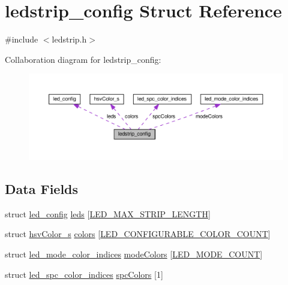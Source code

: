 \hypertarget{structledstrip__config}{\section{ledstrip\+\_\+config Struct Reference}
\label{structledstrip__config}
}


{\ttfamily \#include $<$ledstrip.\+h$>$}



Collaboration diagram for ledstrip\+\_\+config\+:\nopagebreak
\begin{figure}[H]
\begin{center}
\leavevmode
\includegraphics[width=350pt]{structledstrip__config__coll__graph}
\end{center}
\end{figure}
\subsection*{Data Fields}
\begin{DoxyCompactItemize}
\item 
struct \hyperlink{structled__config}{led\+\_\+config} \hyperlink{structledstrip__config_adbcd2e3a0ba8f4b014f75e967ed5f180}{leds} \mbox{[}\hyperlink{config_2ledstrip_8h_a7f8ff468ff6bbb673274f84e042cad47}{L\+E\+D\+\_\+\+M\+A\+X\+\_\+\+S\+T\+R\+I\+P\+\_\+\+L\+E\+N\+G\+T\+H}\mbox{]}
\item 
struct \hyperlink{structhsvColor__s}{hsv\+Color\+\_\+s} \hyperlink{structledstrip__config_a1a7c33abb0d7b2ee9cf1e074cf499169}{colors} \mbox{[}\hyperlink{config_2ledstrip_8h_a558c50db19fe692e9ab8afcfc30443fc}{L\+E\+D\+\_\+\+C\+O\+N\+F\+I\+G\+U\+R\+A\+B\+L\+E\+\_\+\+C\+O\+L\+O\+R\+\_\+\+C\+O\+U\+N\+T}\mbox{]}
\item 
struct \hyperlink{structled__mode__color__indices}{led\+\_\+mode\+\_\+color\+\_\+indices} \hyperlink{structledstrip__config_a443dbc325ddf7a7a0bb12342c75f50d5}{mode\+Colors} \mbox{[}\hyperlink{config_2ledstrip_8h_aae88569d0f355e430fcee9db484b9c40}{L\+E\+D\+\_\+\+M\+O\+D\+E\+\_\+\+C\+O\+U\+N\+T}\mbox{]}
\item 
struct \hyperlink{structled__spc__color__indices}{led\+\_\+spc\+\_\+color\+\_\+indices} \hyperlink{structledstrip__config_a1afd5bff5f9b2ff3f8537e9d7ec91c8c}{spc\+Colors} \mbox{[}1\mbox{]}
\end{DoxyCompactItemize}



